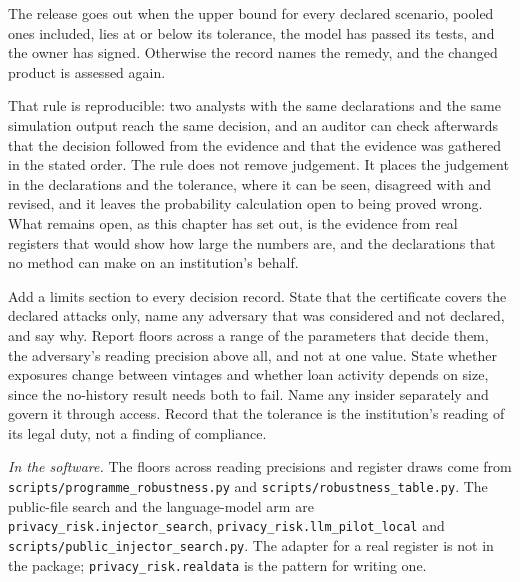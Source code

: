 The release goes out when the upper bound for every declared scenario, pooled ones
included, lies at or below its tolerance, the model has passed its tests, and the
owner has signed. Otherwise the record names the remedy, and the changed product is
assessed again.

That rule is reproducible: two analysts with the same declarations and the same
simulation output reach the same decision, and an auditor can check afterwards that
the decision followed from the evidence and that the evidence was gathered in the
stated order. The rule does not remove judgement. It places the judgement in the
declarations and the tolerance, where it can be seen, disagreed with and revised, and
it leaves the probability calculation open to being proved wrong. What remains open,
as this chapter has set out, is the evidence from real registers that would show how
large the numbers are, and the declarations that no method can make on an
institution's behalf.

\begin{inpractice}
\setlength{\emergencystretch}{3em}%
Add a limits section to every decision record. State that the certificate covers the
declared attacks only, name any adversary that was considered and not declared, and
say why. Report floors across a range of the parameters that decide them, the
adversary's reading precision above all, and not at one value. State whether
exposures change between vintages and whether loan activity depends on size, since
the no-history result needs both to fail. Name any insider separately and govern it
through access. Record that the tolerance is the institution's reading of its legal
duty, not a finding of compliance.

\smallskip\noindent\textit{In the software.} The floors across reading precisions and
register draws come from \texttt{scripts/\allowbreak{}programme\_\allowbreak{}robustness.\allowbreak{}py} and
\texttt{scripts/\allowbreak{}robustness\_\allowbreak{}table.\allowbreak{}py}. The public-file search and the language-model
arm are \texttt{privacy\_\allowbreak{}risk.\allowbreak{}injector\_\allowbreak{}search},
\texttt{privacy\_\allowbreak{}risk.\allowbreak{}llm\_\allowbreak{}pilot\_\allowbreak{}local} and
\texttt{scripts/\allowbreak{}public\_\allowbreak{}injector\_\allowbreak{}search.\allowbreak{}py}. The adapter for a real register is not
in the package; \texttt{privacy\_\allowbreak{}risk.\allowbreak{}realdata} is the pattern for writing one.
\end{inpractice}

